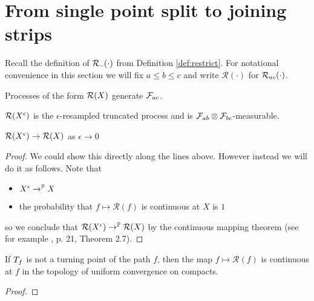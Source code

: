 {
\section{From single point split to joining strips}

\newcommand{\Res}[1]{\mathcal{R}(#1)}

Recall the definition of $\mathcal{R}_{{\cdot}{\cdot}}(\cdot)$ from
Definition \ref{def:restrict}.  For notational convenience in this
section we will fix $a \le b \le c$ and write $\Res{\cdot}$ for
$\mathcal{R}_{{a}{c}}(\cdot)$.

\newcommand{\AuB}{A \cup B}
\newcommand{\F}{\mathcal{F}}

\newcommand{\sampledT}{\sampled^T}
\newcommand{\sampledTe}{\sampled^{T,\epsilon}}
\newcommand{\resampledeT}{{\resamplede}^{,T}}

Processes of the form $\Res{\sampled}$ generate $\mathcal{F}_{a c}$.

$\Res{\resamplede}$ is the $\epsilon$-resampled truncated process and is
$\mathcal{F}_{a b} \otimes \mathcal{F}_{b c}$-measurable.

\begin{lemma}
  $\Res{\resamplede} \to \Res{\sampled}$ as $\epsilon \to 0$
\end{lemma}

\begin{proof}
  We could show this directly along the lines above.  However instead
  we will do it as follows.  Note that
  \begin{itemize}
  \item $X^{\epsilon} \to^{\mathbb{P}} X$
  \item the probability that $f \mapsto \Res{f}$ is continuous
    at $X$ is $1$
  \end{itemize}
  so we conclude that $\Res{\resamplede} \to^\P
  \Res{\sampled}$ by the continuous mapping theorem (see for
  example \cite{billingsley}, p. 21, Theorem 2.7).
\end{proof}

\begin{lemma}
  If $T_{f}$ is not a turning point of the path $f$,
  then the map $f \mapsto \Res{f}$ is continuous at $f$ in the
  topology of uniform convergence on compacts.
\end{lemma}

\begin{proof}
\end{proof}}
